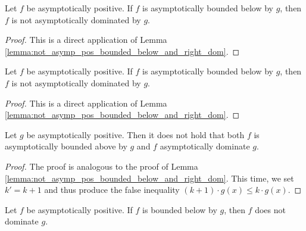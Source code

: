 \begin{theorem}
    \label{thm:not_asymp_right_dom_of_bounded_below_pos}
    \leanok
    Let $f$ be asymptotically positive. If $f$ is asymptotically bounded below by $g$, 
    then $f$ is not asymptotically dominated by $g$.
\end{theorem}

\begin{proof}
    \leanok
    This is a direct application of Lemma \ref{lemma:not_asymp_pos_bounded_below_and_right_dom}. 
\end{proof}

\begin{theorem}
    \label{thm:not_asymp_bounded_below_of_right_dom_pos}
    \leanok
    Let $f$ be asymptotically positive. If $f$ is asymptotically bounded below by $g$, 
    then $f$ is not asymptotically dominated by $g$.
\end{theorem}

\begin{proof}
    \leanok
    This is a direct application of Lemma \ref{lemma:not_asymp_pos_bounded_below_and_right_dom}. 
\end{proof}

\begin{lemma}
    \label{lemma:not_asymp_pos_bounded_above_and_left_dom}
    \leanok
    Let $g$ be asymptotically positive. Then it does not hold that both $f$ is asymptotically 
    bounded above by $g$ and $f$ asymptotically dominate $g$.
\end{lemma}

\begin{proof}
    \leanok
    The proof is analogous to the proof of Lemma 
    \ref{lemma:not_asymp_pos_bounded_below_and_right_dom}. This time, we set $k' = k + 1$
    and thus produce the false inequality $(k + 1) \cdot g(x) \le k \cdot g(x)$.
\end{proof}

\begin{theorem}
    \label{thm:not_asymp_left_dom_of_bounded_above_pos}
    \leanok
    Let $f$ be asymptotically positive. If $f$ is bounded below by $g$, then $f$ 
    does not dominate $g$.
\end{theorem}

